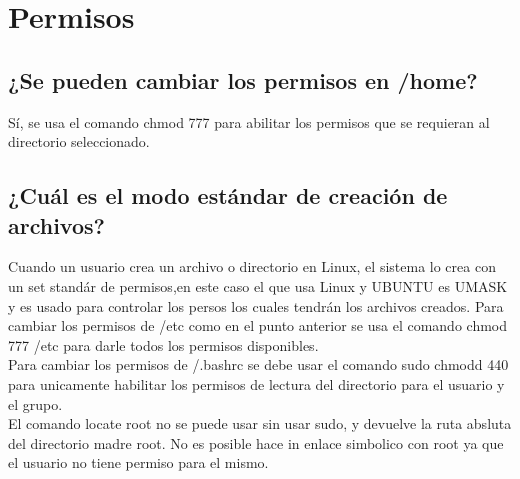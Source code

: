 \documentclass[
  letterpaper, 
  maincolor=black,
  sectioncolor=black!90,
  subsectioncolor=black!70,
  itemtextcolor=black!40,
]{fortysecondscv}
\begin{document}
    
\section{Permisos}
    \subsection{¿Se pueden cambiar los permisos en /home?}
        Sí, se usa el comando chmod 777 para abilitar los permisos que se requieran al directorio seleccionado. 
    \subsection{¿Cuál es el modo estándar de creación de archivos?}
        Cuando un usuario crea un archivo o directorio en Linux, el sistema lo crea con un set standár de permisos,en este caso el que usa Linux y UBUNTU es UMASK y es usado para controlar los persos los cuales tendrán los archivos creados. 
        Para cambiar los permisos de /etc como en el punto anterior se usa el comando chmod 777 /etc para darle todos los permisos disponibles.\\
        Para cambiar los permisos de /.bashrc se debe usar el comando sudo chmodd 440 para unicamente habilitar los permisos de lectura del directorio para el usuario y el grupo.\\
        El comando locate root no se puede usar sin usar sudo, y devuelve la ruta absluta del directorio madre root.
        No es posible hace in enlace simbolico con root ya que el usuario no tiene permiso para el mismo.
        
        
        
        
    
    

    
\end{document}
